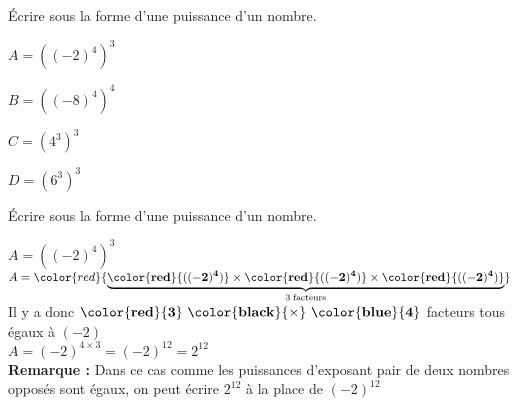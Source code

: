 \begin{exercice*}    
    Écrire sous la forme d'une puissance d'un nombre.
    \begin{multicols}{2}
        \begin{spacing}{2}
            $A=\left((-2)^4\right)^{3}$
            
            $B=\left((-8)^4\right)^{4}$

            \columnbreak            
            $C=\left(4^3\right)^{3}$

            $D=\left(6^3\right)^{3}$
        \end{spacing}
    \end{multicols}
\end{exercice*}
\begin{corrige}
    Écrire sous la forme d'une puissance d'un nombre.
            
            
            
            \begin{itemize}
                \def\item{} %
                \item  $A=\left((-2)^4\right)^{3}$\\
                $A=\color{red}{\underbrace{\mathbf{\color{red}{((-2)^4)}} \times \mathbf{\color{red}{((-2)^4)}}\times \mathbf{\color{red}{((-2)^4)}}}_{3\thickspace\text{facteurs}}}$\\            
                Il y a donc $\mathbf{\color{red}{3}~\color{black}{\times}~\color{blue}{4}}$ facteurs tous égaux à $(-2)$\\
                $A=(-2)^{4\times3} = (-2)^{12}=  2^{12}$\\
                \textbf{Remarque : } Dans ce cas comme les puissances d'exposant pair de deux nombres opposés sont égaux, on peut écrire $ 2^{12}$ à la place de $(-2)^{12}$


\end{itemize}
\end{corrige}
